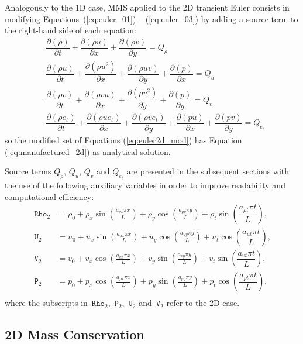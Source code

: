 \documentclass[10pt]{article}
\newcommand{\Diff}[2] {\dfrac{\partial( #1)}{\partial #2}}
\newcommand{\Rho}{\,\mathtt{Rho}}
\newcommand{\PP}{\,\mathtt{P}}
\newcommand{\U}{\,\mathtt{U}}
\newcommand{\V}{\,\mathtt{V}}
\begin{document}
Analogously to the 1D case, MMS applied to the 2D transient Euler consists in modifying Equations~(\ref{eq:euler_01}) -- (\ref{eq:euler_03}) by adding a source term to the right-hand side of each equation:
\begin{equation}
\begin{split}
\label{eq:euler2d_mod}
&\Diff{\rho}{t} + \Diff{\rho u}{x}+\Diff{\rho v}{y} = Q_\rho\\
&\Diff{\rho u}{t} +  \Diff{\rho u^2 }{x}+\Diff{\rho uv}{y} +\Diff{p}{x}= Q_u\\
&\Diff{\rho v}{t} +  \Diff{\rho vu}{x}+\Diff{\rho v^2}{y} +\Diff{p}{y}= Q_v\\
& \Diff{\rho e_t}{t} +\Diff{\rho ue_t }{x}+\Diff{\rho ve_t}{y}+\Diff{pu}{x} +\Diff{pv}{y}= Q_{e_t}
\end{split}
\end{equation}
so the modified set of Equations (\ref{eq:euler2d_mod}) has Equation (\ref{eq:manufactured_2d}) as analytical solution.


Source terms $Q_\rho$, $Q_u$, $Q_v$ and $Q_{e_t}$ are presented in the subsequent sections with the use of the following auxiliary variables in order to improve readability and computational efficiency:
\begin{equation*}
 \begin{split}
\label{eq:aux_2d}
\Rho_2 &= \rho_{0}+ \rho_{x} \sin\left(\frac{a_{ \rho x} \pi x}{L}\right)+ \rho_{y} \cos\left(\frac{a_{ \rho y} \pi y}{L}\right)+ \rho_t \sin\left(\dfrac{a_{\rho t} \pi t}{L}\right),\\
\U_2 &= u_{0}+u_{x} \sin\left(\frac{a_{u x} \pi x}{L}\right)+u_{y} \cos\left(\frac{a_{u y} \pi y}{L}\right) + u_t \cos\left(\dfrac{a_{u t} \pi t}{L}\right),\\
\V_2 &= v_{0}+v_{x} \cos\left(\frac{a_{v x} \pi x}{L}\right)+v_{y} \sin\left(\frac{a_{v y} \pi y}{L}\right)+ v_t \sin\left(\dfrac{a_{v t} \pi t}{L}\right),\\
\PP_2 &= p_{0}+p_{x} \cos\left(\frac{a_{p x} \pi x}{L}\right)+p_{y} \sin\left(\frac{a_{p y} \pi y}{L}\right)+ p_t \cos\left(\dfrac{a_{p t} \pi t}{L}\right),\\
\end{split}
\end{equation*}
%
where the subscripts in $\Rho_2$, $\PP_2$, $\U_2$ and $\V_2$ refer to the 2D case.

\subsection{2D Mass Conservation}
\end{document}

